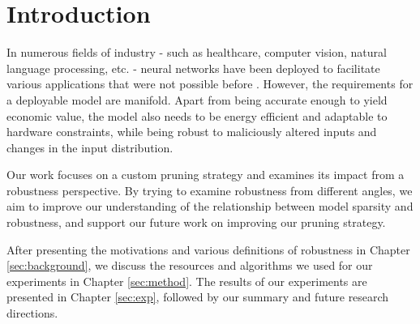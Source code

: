 \section*{Introduction}

In numerous fields of industry - such as healthcare, computer vision, natural language processing, etc. - neural networks have been deployed
to facilitate various applications that were not possible before \cite{effnet}. However, the requirements for a deployable model are
manifold. Apart from being accurate enough to yield economic value, the model also needs to be energy efficient and adaptable
to hardware constraints, while being robust to maliciously altered inputs and changes in the input distribution. 

Our work focuses on a custom pruning strategy and examines its impact from a robustness perspective. By trying to examine robustness from different
angles, we aim to improve our understanding of the relationship between model sparsity and robustness, and support our future work on
improving our pruning strategy.  

After presenting the motivations and various definitions of robustness in Chapter \ref{sec:background}, we discuss the resources and algorithms we
used for our experiments in Chapter \ref{sec:method}. The results of our experiments are presented in Chapter \ref{sec:exp}, followed by
our summary and future research directions.
